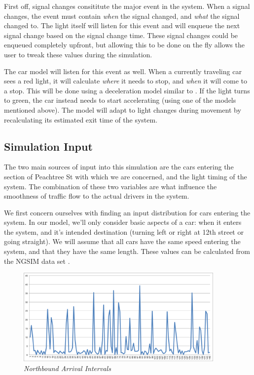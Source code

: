 \documentclass[a4paper,12pt]{article}
\begin{document}
First off, signal changes consititute the major event in the system. When a signal changes, the event must contain
\emph{when} the signal changed, and \emph{what} the signal changed to. The light itself will listen for this event
and will enqueue the next signal change based on the signal change time. These signal changes could be enqueued
completely upfront, but allowing this to be done on the fly allows the user to tweak these values during the simulation.

The car model will listen for this event as well. When a currently traveling car sees a red light, it will calculate
\emph{where} it needs to stop, and \emph{when} it will come to a stop. This will be done using a deceleration model
similar to \cite{deceleration}. If the light turns to green, the car instead needs to start accelerating (using one of
the models mentioned above). The model will adapt to light changes during movement by recalculating its estimated
exit time of the system.

\subsection{Simulation Input}
The two main sources of input into this simulation are the cars entering the section of Peachtree St with which we are
concerned, and the light timing of the system. The combination of these two variables are what influence the smoothness
of traffic flow to the actual drivers in the system.

We first concern ourselves with finding an input distribution for cars entering the system. In our model, we'll only
consider basic aspects of a car: when it enters the system, and it's intended destination (turning left or right at
12th street or going straight). We will assume that all cars have the same speed entering the system, and that they
have the same length. These values can be calculated from the NGSIM data set \cite{ngsim}.

\begin{figure}
\begin{center}  
\includegraphics[width=4in]{../northbound.png}  
\caption{\small \sl Northbound Arrival Intervals \label{fig:northbound_arrival}}  
\end{center}  
\end{figure} 
\end{document}
